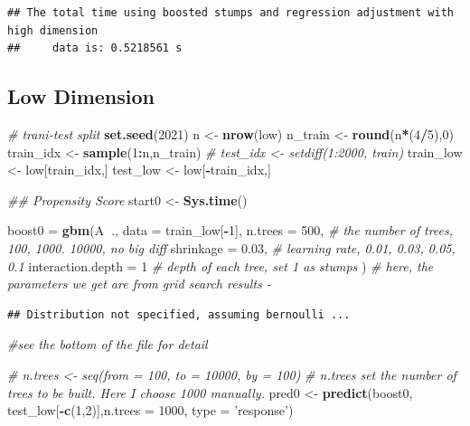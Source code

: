 \documentclass[]{article}
\newenvironment{Shaded}{\begin{snugshade}}{\end{snugshade}}
\newcommand{\CommentTok}[1]{\textcolor[rgb]{0.56,0.35,0.01}{\textit{#1}}}
\newcommand{\DataTypeTok}[1]{\textcolor[rgb]{0.13,0.29,0.53}{#1}}
\newcommand{\DecValTok}[1]{\textcolor[rgb]{0.00,0.00,0.81}{#1}}
\newcommand{\FloatTok}[1]{\textcolor[rgb]{0.00,0.00,0.81}{#1}}
\newcommand{\KeywordTok}[1]{\textcolor[rgb]{0.13,0.29,0.53}{\textbf{#1}}}
\newcommand{\NormalTok}[1]{#1}
\newcommand{\OperatorTok}[1]{\textcolor[rgb]{0.81,0.36,0.00}{\textbf{#1}}}
\newcommand{\StringTok}[1]{\textcolor[rgb]{0.31,0.60,0.02}{#1}}
\begin{document}
\begin{verbatim}
## The total time using boosted stumps and regression adjustment with high dimension 
##     data is: 0.5218561 s
\end{verbatim}

\hypertarget{low-dimension}{%
\subsection{Low Dimension}\label{low-dimension}}

\begin{Shaded}
\begin{Highlighting}[]
\CommentTok{# trani-test split}
\KeywordTok{set.seed}\NormalTok{(}\DecValTok{2021}\NormalTok{)}
\NormalTok{n <-}\StringTok{ }\KeywordTok{nrow}\NormalTok{(low)}
\NormalTok{n_train <-}\StringTok{ }\KeywordTok{round}\NormalTok{(n}\OperatorTok{*}\NormalTok{(}\DecValTok{4}\OperatorTok{/}\DecValTok{5}\NormalTok{),}\DecValTok{0}\NormalTok{)}
\NormalTok{train_idx <-}\StringTok{ }\KeywordTok{sample}\NormalTok{(}\DecValTok{1}\OperatorTok{:}\NormalTok{n,n_train)}
\CommentTok{# test_idx <- setdiff(1:2000, train)}
\NormalTok{train_low <-}\StringTok{ }\NormalTok{low[train_idx,]}
\NormalTok{test_low <-}\StringTok{ }\NormalTok{low[}\OperatorTok{-}\NormalTok{train_idx,]}


\CommentTok{## Propensity Score}
\NormalTok{start0 <-}\StringTok{ }\KeywordTok{Sys.time}\NormalTok{()}

\NormalTok{boost0 =}\StringTok{ }\KeywordTok{gbm}\NormalTok{(A}\OperatorTok{~}\NormalTok{., }\DataTypeTok{data =}\NormalTok{ train_low[}\OperatorTok{-}\DecValTok{1}\NormalTok{], }
            \DataTypeTok{n.trees =} \DecValTok{500}\NormalTok{, }\CommentTok{# the number of trees, 100, 1000. 10000, no big diff}
            \DataTypeTok{shrinkage =} \FloatTok{0.03}\NormalTok{, }\CommentTok{# learning rate, 0.01, 0.03, 0.05, 0.1}
            \DataTypeTok{interaction.depth =} \DecValTok{1} \CommentTok{# depth of each tree, set 1 as stumps}
\NormalTok{            ) }\CommentTok{# here, the parameters we get are from grid search results - }
\end{Highlighting}
\end{Shaded}

\begin{verbatim}
## Distribution not specified, assuming bernoulli ...
\end{verbatim}

\begin{Shaded}
\begin{Highlighting}[]
              \CommentTok{#see the bottom of the file for detail}

\CommentTok{# n.trees <- seq(from = 100, to = 10000, by = 100)}
\CommentTok{# n.trees set the number of trees to be built. Here I choose 1000 manually.}
\NormalTok{pred0 <-}\StringTok{ }\KeywordTok{predict}\NormalTok{(boost0, test_low[}\OperatorTok{-}\KeywordTok{c}\NormalTok{(}\DecValTok{1}\NormalTok{,}\DecValTok{2}\NormalTok{)],}\DataTypeTok{n.trees =} \DecValTok{1000}\NormalTok{, }\DataTypeTok{type =} \StringTok{'response'}\NormalTok{)}
\end{Highlighting}
\end{Shaded}
\end{document}

